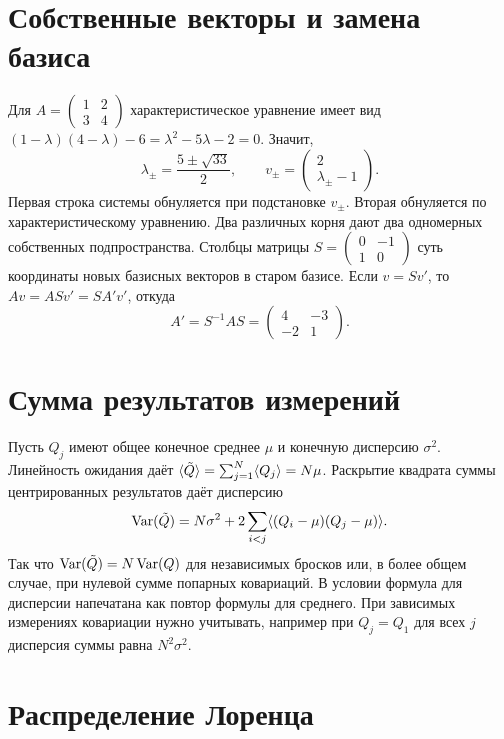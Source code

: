 \documentclass[11pt,a4paper]{article}
\begin{document}

\section{Собственные векторы и замена базиса}

Для \(A=\begin{pmatrix}1&2\\3&4\end{pmatrix}\) характеристическое
уравнение имеет вид \((1-\lambda)(4-\lambda)-6=\lambda^2-5\lambda-2=0\).
Значит,
\[
 \lambda_\pm=\frac{5\pm\sqrt{33}}2,\qquad
 v_\pm=\begin{pmatrix}2\\ \lambda_\pm-1\end{pmatrix}.
\]
Первая строка системы обнуляется при подстановке \(v_\pm\).
Вторая обнуляется по характеристическому уравнению. Два различных
корня дают два одномерных собственных подпространства.
Столбцы матрицы \(S=\begin{pmatrix}0&-1\\1&0\end{pmatrix}\)
суть координаты новых базисных векторов в старом базисе. Если
\(v=S v'\), то \(Av=ASv'=S A'v'\), откуда
\[
 A'=S^{-1}AS=\begin{pmatrix}4&-3\\-2&1\end{pmatrix}.
\]

\section{Сумма результатов измерений}

Пусть \(Q_j\) имеют общее конечное среднее \(\mu\) и конечную
дисперсию \(\sigma^2\). Линейность ожидания даёт
\(\langle \tilde Q\rangle=\sum_{j=1}^N\langle Q_j\rangle=N\mu\).
Раскрытие квадрата суммы центрированных результатов даёт дисперсию
\[
 \operatorname{Var}(\tilde Q)=N\sigma^2+
     2\sum_{i<j}\langle (Q_i-\mu)(Q_j-\mu)\rangle.
\]
Так что \(\operatorname{Var}(\tilde Q)=N\operatorname{Var}(Q)\) для независимых бросков или,
в более общем случае, при нулевой сумме попарных ковариаций. В условии формула для
дисперсии напечатана как повтор формулы для среднего. При зависимых
измерениях ковариации нужно учитывать, например при \(Q_j=Q_1\) для
всех \(j\) дисперсия суммы равна \(N^2\sigma^2\).

\section{Распределение Лоренца}
\end{document}
